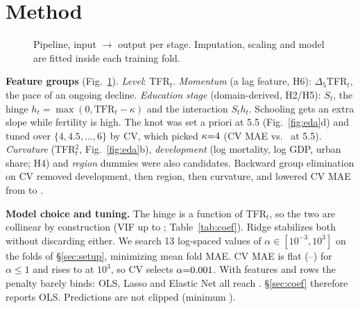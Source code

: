 \documentclass[11pt]{article}
\begin{document}
\section{Method}
\label{sec:method}
\begin{figure}[t]
\centering
{}
\caption{Pipeline, input $\rightarrow$ output per stage. Imputation, scaling and model are fitted inside each training fold.}
\label{fig:pipeline}
\end{figure}

\textbf{Feature groups} (Fig.~\ref{fig:pipeline}). \emph{Level}: TFR$_t$. \emph{Momentum} (a lag feature, H6): $\Delta_5$TFR$_t$, the pace of an ongoing decline. \emph{Education stage} (domain-derived, H2/H5): $S_t$, the hinge $h_t=\max(0,\mathrm{TFR}_t-\kappa)$ and the interaction $S_t h_t$. Schooling gets an extra slope while fertility is high. The knot was set a priori at 5.5 (Fig.~\ref{fig:eda}d) and tuned over $\{4,4.5,\dots,6\}$ by CV, which picked $\kappa{=}4$ (CV MAE \abC{} vs.\ \cvKnotFiveFive{} at 5.5). \emph{Curvature} (TFR$_t^2$, Fig.~\ref{fig:eda}b), \emph{development} (log mortality, log GDP, urban share; H4) and \emph{region} dummies were also candidates. Backward group elimination on CV removed development, then region, then curvature, and lowered CV MAE from \cvAllGroups{} to \abC.

\textbf{Model choice and tuning.} The hinge is a function of TFR$_t$, so the two are collinear by construction (VIF up to \vifMax; Table~\ref{tab:coef}). Ridge stabilizes both without discarding either. We search 13 log-spaced values of $\alpha\in[10^{-3},10^{3}]$ on the folds of \S\ref{sec:setup}, minimizing mean fold MAE. CV MAE is flat (\abC--\tuneOne) for $\alpha\le1$ and rises to \tuneMax{} at $10^3$, so CV selects $\alpha{=}0.001$. With \nFeatures{} features and \rowsTrain{} rows the penalty barely binds: OLS, Lasso and Elastic Net all reach \cvOLS. \S\ref{sec:coef} therefore reports OLS. Predictions are not clipped (minimum \minPred).
\end{document}

